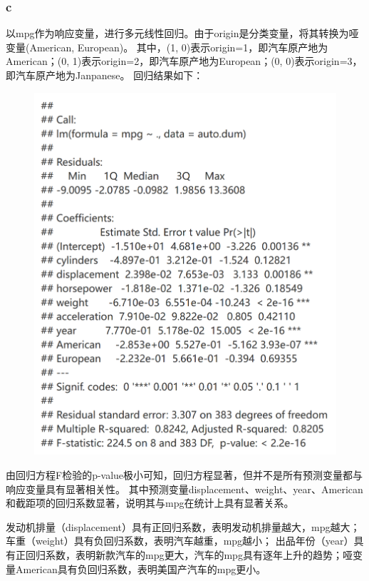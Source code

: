\documentclass[12pt,a4paper]{article}
\begin{document}
    \subsubsection*{c}
    以mpg作为响应变量，进行多元线性回归。由于origin是分类变量，将其转换为哑变量(American, European)。
    其中，(1, 0)表示origin=1，即汽车原产地为American；(0, 1)表示origin=2，即汽车原产地为European；(0, 0)表示origin=3，即汽车原产地为Janpanese。
    回归结果如下：
    \begin{figure}[H]
        \centering
        \includegraphics[scale=0.3]{Auto_LR.png}
    \end{figure}
    由回归方程F检验的p-value极小可知，回归方程显著，但并不是所有预测变量都与响应变量具有显著相关性。
    其中预测变量displacement、weight、year、American和截距项的回归系数显著，说明其与mpg在统计上具有显著关系。\par
    发动机排量（displacement）具有正回归系数，表明发动机排量越大，mpg越大；车重（weight）具有负回归系数，表明汽车越重，mpg越小；
    出品年份（year）具有正回归系数，表明新款汽车的mpg更大，汽车的mpg具有逐年上升的趋势；哑变量American具有负回归系数，表明美国产汽车的mpg更小。
\end{document}
